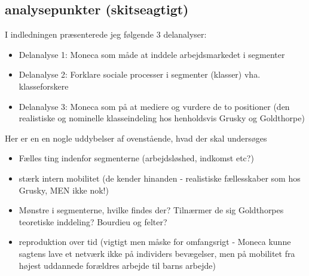 \subsection{analysepunkter (skitseagtigt)}

I indledningen præsenterede jeg følgende 3 delanalyser:

\begin{itemize}
  \item Delanalyse 1: Moneca som måde at inddele arbejdsmarkedet i segmenter
  \item Delanalyse 2: Forklare sociale processer i segmenter (klasser) vha. klasseforskere
  \item Delanalyse 3: Moneca som på at mediere og vurdere de to positioner (den realistiske og nominelle klasseindeling hos henholdsvis Grusky og Goldthorpe)
\end{itemize}


Her er en en nogle uddybelser af ovenstående, hvad der skal undersøges

\begin{itemize}
  \item Fælles ting indenfor segmenterne (arbejdsløshed, indkomst etc?)
  \item stærk intern mobilitet (de kender hinanden - realistiske fællesskaber som hos Grusky, MEN ikke nok!)
  \item Mønstre i segmenterne, hvilke findes der? Tilnærmer de sig Goldthorpes teoretiske inddeling? Bourdieu og felter?
   \item reproduktion over tid (vigtigt men måske for omfangsrigt - Moneca kunne sagtens lave et netværk ikke på individers bevægelser, men på mobilitet fra højest uddannede forældres arbejde til barns arbejde)
\end{itemize}



